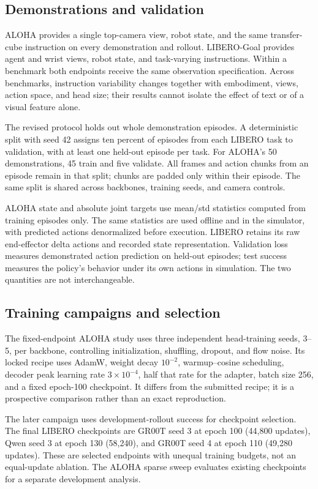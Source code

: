\documentclass[conference]{IEEEtran}
\begin{document}
\subsection{Demonstrations and validation}
ALOHA provides a single top-camera view, robot state, and the same
transfer-cube instruction on every demonstration and rollout. LIBERO-Goal
provides agent and wrist views, robot state, and task-varying instructions.
Within a benchmark both endpoints receive the same observation specification.
Across benchmarks, instruction variability changes together with embodiment,
views, action space, and head size; their results cannot isolate the effect
of text or of a visual feature alone.

The revised protocol holds out whole demonstration episodes. A deterministic
split with seed 42 assigns ten percent of episodes from each LIBERO task to
validation, with at least one held-out episode per task. For ALOHA's 50
demonstrations, 45 train and five validate. All frames and action chunks from
an episode remain in that split; chunks are padded only within their episode.
The same split is shared across backbones, training seeds, and camera controls.

ALOHA state and absolute joint targets use mean/std statistics computed from
training episodes only. The same statistics are used offline and in the simulator,
with predicted actions denormalized before execution. LIBERO retains its raw
end-effector delta actions and recorded state representation. Validation loss
measures demonstrated action prediction on held-out episodes; test success
measures the policy's behavior under its own actions in simulation. The two
quantities are not interchangeable.

\subsection{Training campaigns and selection}
The fixed-endpoint ALOHA study uses three independent head-training seeds,
3--5, per backbone, controlling initialization, shuffling, dropout, and flow
noise. Its locked recipe uses AdamW, weight decay $10^{-2}$, warmup--cosine
scheduling, decoder peak learning rate $3\times10^{-4}$, half that rate for the
adapter, batch size 256, and a fixed epoch-100 checkpoint. It differs from the
submitted recipe; it is a prospective comparison rather than an exact reproduction.

The later campaign uses development-rollout success for checkpoint selection.
The final LIBERO checkpoints are GR00T seed 3 at epoch 100 (44,800 updates),
Qwen seed 3 at epoch 130 (58,240), and GR00T seed 4 at epoch 110 (49,280
updates). These are selected endpoints with unequal training budgets, not an
equal-update ablation. The ALOHA sparse sweep evaluates existing checkpoints
for a separate development analysis.
\end{document}
